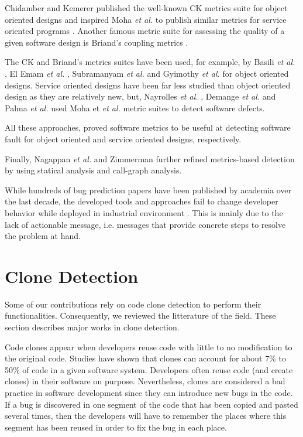 Chidamber and Kemerer published the well-known CK metrics suite \cite{Chidamber1994} for object oriented designs and inspired Moha \textit{et al.} to publish similar metrics for service oriented programs \cite{Moha}.
Another famous metric suite for assessing the quality of a given software design is Briand's coupling metrics \cite{Briand1999a}.

The CK and Briand's metrics suites have been used, for example, by Basili \textit{et al.} \cite{Basili1996}, El Emam \textit{et al.} \cite{ElEmam2001},  Subramanyam \textit{et al.} \cite{Subramanyam2003} and Gyimothy \textit{et al.} \cite{Gyimothy2005} for object oriented designs.
Service oriented designs have been far less studied than object oriented design as they are relatively new, but, Nayrolles \textit{et al.} \cite{Nayrolles,Nayrolles2013d}, Demange \textit{et al.} \cite{demange2013} and Palma \textit{et al.} \cite{Palma2013} used Moha et \textit{et al.} metric suites to detect software defects.

All these approaches, proved software metrics to be useful at detecting software fault for object oriented and service oriented designs, respectively.

Finally, Nagappan \textit{et al.} \cite{Nagappan2005,Nagappan2006} and Zimmerman \cite{Zimmermann2007,Zimmermann2008} further refined metrics-based detection by using statical analysis and call-graph analysis.

While hundreds of bug prediction papers have been published by academia over the last decade, the developed tools and approaches fail to change developer behavior while deployed in industrial environment \cite{Lewis2013}.
This is mainly due to the lack of actionable message, i.e. messages that provide concrete steps to resolve the problem at hand.

\section{Clone Detection}
\label{sec:rel-clones}

Some of our contributions rely on code clone detection to perform their functionalities.
Consequently, we reviewed the litterature of the field.
These section describes major works in clone detection.

Code clones appear when developers reuse code with little to no modification to the original code.
Studies have shown  that clones can account for about 7\% to 50\% of code in a given software system\cite{Baker, StephaneDucasse}.
Developers often reuse code (and create clones) in their software on purpose\cite{Kim2005}.
Nevertheless, clones are considered a bad practice in software development since they can introduce new bugs in the code\cite{Kapser2006,Juergens2009,Li2006}.
If a  bug is discovered in one segment of the code that has been copied and pasted several times, then the developers will have to remember the places where this segment has been reused in order to fix the bug in each place.

